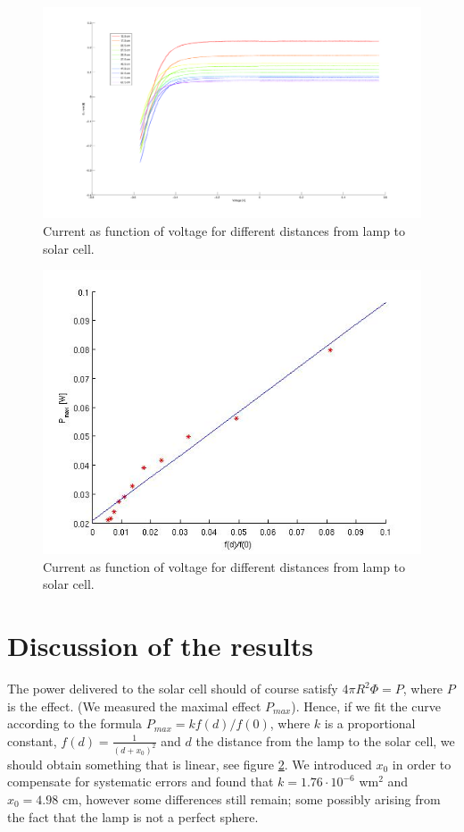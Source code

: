 \documentclass[a4paper]{article}
\begin{document}
\begin{figure}[h!]
  \label{ivsu}
  \begin{center}
    \includegraphics[scale=0.2]{IvsU.jpg}
  \end{center}
  \caption{Current as function of voltage for different distances from lamp to solar cell.}
\end{figure}
\begin{figure}[h!]
  \label{pmaxvsf}
  \begin{center}
    \includegraphics[scale=0.2]{pmaxvsf.jpg}
  \end{center}
  \caption{Current as function of voltage for different distances from lamp to solar cell.}
\end{figure}
\section{Discussion of the results}
The power delivered to the solar cell should of course satisfy $4\pi R^2\Phi = P$, where $P$ is the effect. (We measured the maximal effect $P_{max}$). Hence, if we fit the curve according to the formula $P_{max}=kf(d)/f(0)$, where $k$ is a proportional constant, $f(d)=\frac{1}{(d+x_0)^2}$ and $d$ the distance from the lamp to the solar cell, we should obtain something that is linear, see figure \ref{pmaxvsf}. We introduced $x_0$ in order to compensate for systematic errors and found that $k=1.76\cdot 10^{-6}$ wm${}^2$ and $x_0=4.98$ cm, however some differences still remain; some possibly arising from the fact that the lamp is not a perfect sphere.
\end{document}
